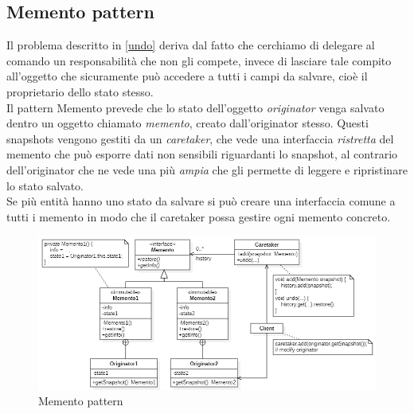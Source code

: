 \documentclass[12pt]{article}
\begin{document}
\newpage
\subsection{Memento pattern}
Il problema descritto in \ref{undo} deriva dal fatto che cerchiamo di delegare al comando un responsabilità che non gli compete, invece di lasciare tale compito all'oggetto che sicuramente può accedere a tutti i campi da salvare, cioè il proprietario dello stato stesso. \\
Il pattern Memento prevede che lo stato dell'oggetto \emph{originator} venga salvato dentro un oggetto chiamato \emph{memento}, creato dall'originator stesso. Questi snapshots vengono gestiti da un \emph{caretaker}, che vede una interfaccia \emph{ristretta} del memento che può esporre dati non sensibili riguardanti lo snapshot, al contrario dell'originator che ne vede una più \emph{ampia} che gli permette di leggere e ripristinare lo stato salvato.\\
Se più entità hanno uno stato da salvare si può creare una interfaccia comune a tutti i memento in modo che il caretaker possa gestire ogni memento concreto.
\begin{figure}[h!]
\centering
\includegraphics[width=\textwidth]{mementoPattern.png}
\caption{Memento pattern}
\label{fig:mementoPattern}
\end{figure}
\end{document}
